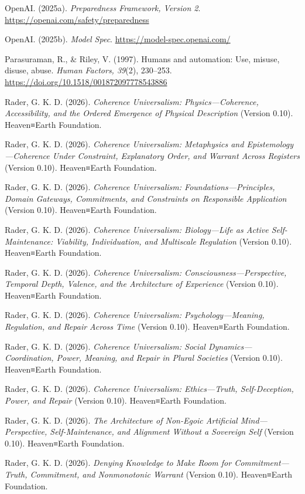 \documentclass[
  11pt,
]{article}
\begin{document}
OpenAI. (2025a). \emph{Preparedness Framework, Version 2}.
\url{https://openai.com/safety/preparedness}

OpenAI. (2025b). \emph{Model Spec}. \url{https://model-spec.openai.com/}

Parasuraman, R., \& Riley, V. (1997). Humans and automation: Use,
misuse, disuse, abuse. \emph{Human Factors, 39}(2), 230--253.
\url{https://doi.org/10.1518/001872097778543886}

Rader, G. K. D. (2026). \emph{Coherence Universalism:
Physics---Coherence, Accessibility, and the Ordered Emergence of
Physical Description} (Version 0.10). Heaven≡Earth Foundation.

Rader, G. K. D. (2026). \emph{Coherence Universalism: Metaphysics and
Epistemology---Coherence Under Constraint, Explanatory Order, and
Warrant Across Registers} (Version 0.10). Heaven≡Earth Foundation.

Rader, G. K. D. (2026). \emph{Coherence Universalism:
Foundations---Principles, Domain Gateways, Commitments, and Constraints
on Responsible Application} (Version 0.10). Heaven≡Earth Foundation.

Rader, G. K. D. (2026). \emph{Coherence Universalism: Biology---Life as
Active Self-Maintenance: Viability, Individuation, and Multiscale
Regulation} (Version 0.10). Heaven≡Earth Foundation.

Rader, G. K. D. (2026). \emph{Coherence Universalism:
Consciousness---Perspective, Temporal Depth, Valence, and the
Architecture of Experience} (Version 0.10). Heaven≡Earth Foundation.

Rader, G. K. D. (2026). \emph{Coherence Universalism:
Psychology---Meaning, Regulation, and Repair Across Time} (Version
0.10). Heaven≡Earth Foundation.

Rader, G. K. D. (2026). \emph{Coherence Universalism: Social
Dynamics---Coordination, Power, Meaning, and Repair in Plural Societies}
(Version 0.10). Heaven≡Earth Foundation.

Rader, G. K. D. (2026). \emph{Coherence Universalism: Ethics---Truth,
Self-Deception, Power, and Repair} (Version 0.10). Heaven≡Earth
Foundation.

Rader, G. K. D. (2026). \emph{The Architecture of Non-Egoic Artificial
Mind---Perspective, Self-Maintenance, and Alignment Without a Sovereign
Self} (Version 0.10). Heaven≡Earth Foundation.

Rader, G. K. D. (2026). \emph{Denying Knowledge to Make Room for
Commitment---Truth, Commitment, and Nonmonotonic Warrant} (Version
0.10). Heaven≡Earth Foundation.
\end{document}
